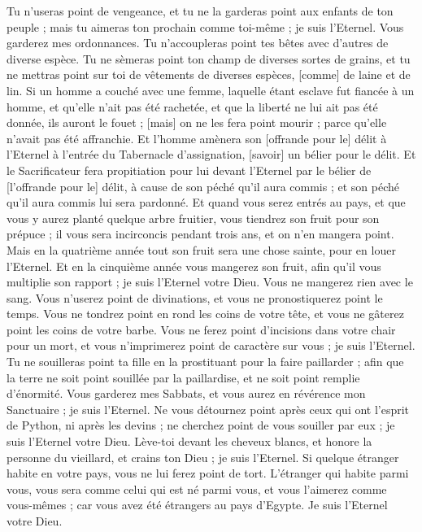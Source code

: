 \begin{multicols}{2}
Tu n'useras point de vengeance, et tu ne la garderas point aux enfants de ton peuple ; mais tu aimeras ton prochain comme toi-même ; je suis l'Eternel.
Vous garderez mes ordonnances. Tu n'accoupleras point tes bêtes avec d'autres de diverse espèce. Tu ne sèmeras point ton champ de diverses sortes de grains, et tu ne mettras point sur toi de vêtements de diverses espèces, [comme] de laine et de lin.
Si un homme a couché avec une femme, laquelle étant esclave fut fiancée à un homme, et qu'elle n'ait pas été rachetée, et que la liberté ne lui ait pas été donnée, ils auront le fouet ; [mais] on ne les fera point mourir ; parce qu'elle n'avait pas été affranchie.
Et l'homme amènera son [offrande pour le] délit à l'Eternel à l'entrée du Tabernacle d'assignation, [savoir] un bélier pour le délit.
Et le Sacrificateur fera propitiation pour lui devant l'Eternel par le bélier de [l'offrande pour le] délit, à cause de son péché qu'il aura commis ; et son péché qu'il aura commis lui sera pardonné.
Et quand vous serez entrés au pays, et que vous y aurez planté quelque arbre fruitier, vous tiendrez son fruit pour son prépuce ; il vous sera incirconcis pendant trois ans, et on n'en mangera point.
Mais en la quatrième année tout son fruit sera une chose sainte, pour en louer l'Eternel.
Et en la cinquième année vous mangerez son fruit, afin qu'il vous multiplie son rapport ; je suis l'Eternel votre Dieu.
Vous ne mangerez rien avec le sang. Vous n'userez point de divinations, et vous ne pronostiquerez point le temps.
Vous ne tondrez point en rond les coins de votre tête, et vous ne gâterez point les coins de votre barbe.
Vous ne ferez point d'incisions dans votre chair pour un mort, et vous n'imprimerez point de caractère sur vous ; je suis l'Eternel.
Tu ne souilleras point ta fille en la prostituant pour la faire paillarder ; afin que la terre ne soit point souillée par la paillardise, et ne soit point remplie d'énormité.
Vous garderez mes Sabbats, et vous aurez en révérence mon Sanctuaire ; je suis l'Eternel.
Ne vous détournez point après ceux qui ont l'esprit de Python, ni après les devins ; ne cherchez point de vous souiller par eux ; je suis l'Eternel votre Dieu.
Lève-toi devant les cheveux blancs, et honore la personne du vieillard, et crains ton Dieu ; je suis l'Eternel.
Si quelque étranger habite en votre pays, vous ne lui ferez point de tort.
L'étranger qui habite parmi vous, vous sera comme celui qui est né parmi vous, et vous l'aimerez comme vous-mêmes ; car vous avez été étrangers au pays d'Egypte. Je suis l'Eternel votre Dieu.

\end{multicols}
